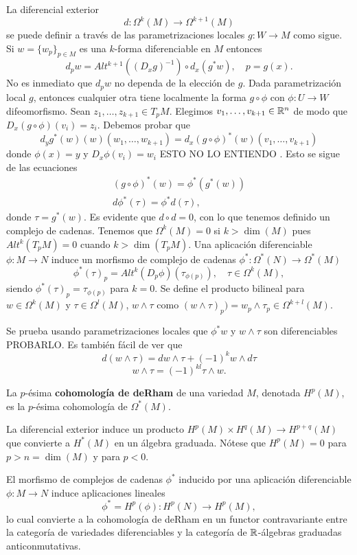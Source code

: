 \documentclass[CV.tex]{subfiles}
\begin{document}
La diferencial exterior
\[
d:\Omega^k(M)\to\Omega^{k+1}(M)
\]
se puede definir a través de las parametrizaciones locales $g:W\to M$ como sigue. Si $w=\{w_p\}_{p\in M}$ es una $k$-forma diferenciable en $M$ entonces
\[
d_pw=Alt^{k+1}((D_xg)^{-1})\circ d_x(g^*w),\quad p=g(x).
\]
No es inmediato que $d_pw$ no dependa de la elección de $g$. Dada parametrización local $g$, entonces cualquier otra tiene localmente la forma $g\circ\phi$ con $\phi:U\to W$ difeomorfismo. Sean $z_1,\dots, z_{k+1}\in T_pM$. Elegimos $v_1,\dots, v_{k+1}\in\mathbb{R}^n$ de modo que $D_x(g\circ \phi)(v_i)=z_i$. Debemos probar que
\[
d_yg^*(w)(w)(w_1,\dots, w_{k+1})=d_x(g\circ\phi)^*(w)(v_1,\dots,v_{k+1})
\]
donde $\phi(x)=y$ y $D_x\phi(v_i)=w_i$ ESTO NO LO ENTIENDO . Esto se sigue de las ecuaciones 
\begin{gather*}
(g\circ\phi)^*(w)=\phi^*(g^*(w))\\
d\phi^*(\tau)=\phi^*d(\tau),
\end{gather*}
donde $\tau=g^*(w)$. Es evidente que $d\circ d=0$, con lo que tenemos definido un complejo de cadenas. Tenemos que $\Omega^k(M)=0$ si $k>\dim(M)$ pues $Alt^k(T_pM)=0$ cuando $k>\dim(T_pM)$. Una aplicación diferenciable $\phi:M\to N$ induce un morfismo de complejo de cadenas $\phi^*:\Omega^*(N)\to\Omega^*(M)$
\[
\phi^*(\tau)_p=Alt^k(D_p\phi)(\tau_{\phi(p)}),\quad \tau\in \Omega^k(M),
\]
siendo $\phi^*(\tau)_p=\tau_{\phi(p)}$ para $k=0$. Se define el producto bilineal para $w\in\Omega^k(M)$ y $\tau\in\Omega^l(M)$, $w\land\tau$ como $(w\land\tau)_p)=w_p\land\tau_p\in\Omega^{k+l}(M)$.

Se prueba usando parametrizaciones locales que $\phi^*w$ y $w\land\tau$ son diferenciables PROBARLO. Es también fácil de ver que
\[
d(w\land\tau)=dw\land\tau+(-1)^kw\land d\tau
\]
\[
w\land\tau=(-1)^{kl}\tau\land w.
\]

\begin{defi}
La $p$-ésima \textbf{cohomología de deRham} de una variedad $M$, denotada $H^p(M)$, es la $p$-ésima cohomología de $\Omega^*(M)$. 
\end{defi}

La diferencial exterior induce un producto $H^p(M)\times H^q(M)\to H^{p+q}(M)$ que convierte a $H^*(M)$ en un álgebra graduada. Nótese que $H^p(M)=0$ para $p>n=\dim(M)$ y para $p<0$. 

El morfismo de complejos de cadenas $\phi^*$ inducido por una aplicación diferenciable $\phi:M\to N$ induce aplicaciones lineales
\[
\phi^*=H^p(\phi):H^p(N)\to H^p(M),
\]
lo cual convierte a la cohomología de deRham en un functor contravariante entre la categoría de variedades diferenciables y la categoría de $\mathbb{R}$-álgebras graduadas anticonmutativas.
\end{document}
